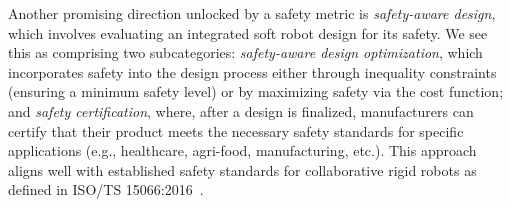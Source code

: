 Another promising direction unlocked by a safety metric is \emph{safety-aware design}, which involves evaluating an integrated soft robot design for its safety. We see this as comprising two subcategories: \emph{safety-aware design optimization}, which incorporates safety into the design process either through inequality constraints (ensuring a minimum safety level) or by maximizing safety via the cost function; and \emph{safety certification}, where, after a design is finalized, manufacturers can certify that their product meets the necessary safety standards for specific applications (e.g., healthcare, agri-food, manufacturing, etc.). This approach aligns well with established safety standards for collaborative rigid robots as defined in ISO/TS 15066:2016~\citep{Isots_15066_2016}.

